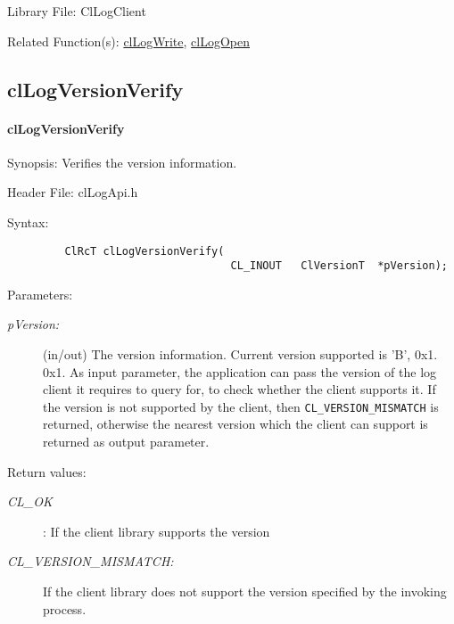 \begin{Desc}
\item[Library File:]Cl\-Log\-Client\end{Desc}
\begin{Desc}
\item[Related Function(s):]\hyperlink{pagelog102}{cl\-Log\-Write}, \hyperlink{pagelog105}{cl\-Log\-Open} \end{Desc}
\newpage



\subsection{clLogVersionVerify}
\hypertarget{pagelog109}{}\paragraph{cl\-Log\-Version\-Verify}\label{pagelog109}
\begin{Desc}
\item[Synopsis:]Verifies the version information.\end{Desc}
\begin{Desc}
\item[Header File:]clLogApi.h\end{Desc}
\begin{Desc}
\item[Syntax:]

\footnotesize\begin{verbatim}         ClRcT clLogVersionVerify(
                                   CL_INOUT   ClVersionT  *pVersion);
\end{verbatim}
\normalsize
\end{Desc}
\begin{Desc}
\item[Parameters:]
\begin{description}
\item[{\em p\-Version:}](in/out) The version information. Current version supported is 'B', 0x1. 0x1. As input parameter, the application can pass the version of the log client it requires to query for, to check whether the client supports it. If the version is not supported by the client, then {\tt CL\_\-VERSION\_\-MISMATCH} is returned, otherwise the nearest version which the client can support is returned as output parameter.\end{description}
\end{Desc}
\begin{Desc}
\item[Return values:]
\begin{description}
\item[{\em CL\_\-OK}]: If the client library supports the version \item[{\em CL\_\-VERSION\_\-MISMATCH:}]If the client library does not support the version specified by the invoking process.\end{description}
\end{Desc}
